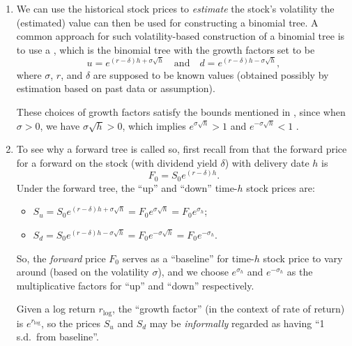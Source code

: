 \begin{enumerate}

\item We can use the historical stock prices to \emph{estimate} the stock's
volatility  the (estimated) value can then be used for
constructing a binomial tree.  A common approach for such volatility-based
construction of a binomial tree is to use a , which is the
binomial tree with the growth factors set to be
\[
u=e^{(r-\delta)h+\sigma\sqrt{h}}\quad\text{and}\quad d=e^{(r-\delta)h-\sigma\sqrt{h}},
\]
where \(\sigma\), \(r\), and \(\delta\) are supposed to be known values
(obtained possibly by estimation based on past data or assumption).

\begin{note}
These choices of growth factors satisfy the bounds mentioned in
, since when \(\sigma>0\), we have
\(\sigma\sqrt{h}>0\), which implies \(e^{\sigma\sqrt{h}}>1\) and
\(e^{-\sigma\sqrt{h}}<1\) .
\end{note}
\item To see why a forward tree is called so, first recall from
 that the forward price for a
forward on the stock  (with dividend yield \(\delta\)) with
delivery date \(h\) is
\[
F_0=S_0e^{(r-\delta)h}.
\]
Under the forward tree, the ``up'' and ``down'' time-\(h\) stock prices are:
\begin{itemize}
\item \(S_u=S_0e^{(r-\delta)h+\sigma\sqrt{h}}=F_0e^{\sigma\sqrt{h}}=F_0e^{\sigma_h}\);
\item \(S_d=S_0e^{(r-\delta)h-\sigma\sqrt{h}}=F_0e^{-\sigma\sqrt{h}}=F_0e^{-\sigma_h}\).
\end{itemize}
So, the \emph{forward} price \(F_0\) serves as a ``baseline'' for time-\(h\)
stock price to vary around (based on the volatility \(\sigma\)), and we choose
\(e^{\sigma_h}\) and \(e^{-\sigma_h}\) as the multiplicative factors for ``up''
and ``down'' respectively.
\begin{intuition}
Given a log return \(r_{\text{log}}\), the ``growth factor'' (in the context of
rate of return) is \(e^{r_{\text{log}}}\), so the prices \(S_u\) and \(S_d\)
may be \emph{informally} regarded as having ``1 s.d.\ from baseline''.
\end{intuition}


\end{enumerate}
